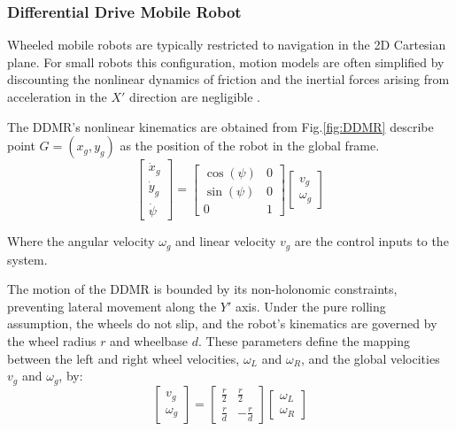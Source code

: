         \subsubsection{Differential Drive Mobile Robot}
    Wheeled mobile robots are typically restricted to navigation in the 2D Cartesian plane. For small robots 
    this configuration, motion models are often simplified by discounting the nonlinear dynamics of friction and 
    the inertial forces arising from acceleration in the $X'$ direction are negligible \cite{KinematicWheeled}. 

    The DDMR's nonlinear kinematics are obtained from Fig.\ref{fig:DDMR} describe point $G=(x_g,y_g)$ as the position of 
    the robot in the global frame.
        \begin{equation}
            \begin{bmatrix}
                \dot x_g \\
                \dot y_g \\
                \dot \psi
            \end{bmatrix}
    =
            \begin{bmatrix}
                \cos(\psi) & 0 \\
                \sin(\psi) & 0 \\
                0 & 1
            \end{bmatrix}
            \begin{bmatrix}
    v_g \\
                \omega_g
            \end{bmatrix}
            \label{eq:DDMRGlobal}
        \end{equation}

    Where the angular velocity $\omega_g$ and linear velocity $v_g$ are the control 
    inputs to the system. 

    The motion of the DDMR is bounded by its non-holonomic constraints, 
    preventing lateral movement along the $Y'$ axis. 
    Under the pure rolling assumption, the wheels do not slip, and the robot's kinematics 
    are governed by the wheel radius $r$ and wheelbase $d$. These parameters define 
    the mapping between the left and right wheel velocities, $\omega_L$ and $\omega_R$, 
    and the global velocities $v_g$ and $\omega_g$, by:
        \begin{equation}
            \begin{bmatrix}
    v_g \\
                \omega_g
            \end{bmatrix}
    =
            \begin{bmatrix}
                \frac{r}{2} & \frac{r}{2} \\
                \frac{r}{d} & -\frac{r}{d}
            \end{bmatrix}
            \begin{bmatrix}
                \omega_L \\
                \omega_R
            \end{bmatrix}
            \label{eq:DDMR}
        \end{equation}

